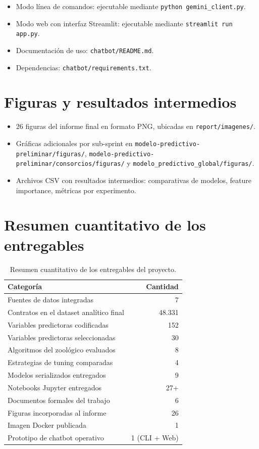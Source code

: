 \documentclass[12pt,letterpaper,oneside]{report}
\begin{document}
\begin{itemize}
    \item Modo línea de comandos: ejecutable mediante
    \texttt{python gemini\_client.py}.
    \item Modo web con interfaz Streamlit: ejecutable mediante
    \texttt{streamlit run app.py}.
    \item Documentación de uso: \texttt{chatbot/README.md}.
    \item Dependencias: \texttt{chatbot/requirements.txt}.
\end{itemize}

\section{Figuras y resultados intermedios}

\begin{itemize}
    \item 26 figuras del informe final en formato PNG, ubicadas en
    \texttt{report/imagenes/}.
    \item Gráficas adicionales por sub-sprint en
    \texttt{modelo-predictivo-preliminar/figuras/},
    \texttt{modelo-predictivo-preliminar/consorcios/figuras/} y
    \texttt{modelo\_predictivo\_global/figuras/}.
    \item Archivos CSV con resultados intermedios: comparativas de modelos,
    feature importance, métricas por experimento.
\end{itemize}

\section{Resumen cuantitativo de los entregables}

\begin{table}[H]
\centering
\caption{Resumen cuantitativo de los entregables del proyecto.}
\label{tab:resumen_entregables}
\begin{tabular}{lr}
\toprule
\textbf{Categoría} & \textbf{Cantidad} \\
\midrule
Fuentes de datos integradas & 7 \\
Contratos en el dataset analítico final & 48.331 \\
Variables predictoras codificadas & 152 \\
Variables predictoras seleccionadas & 30 \\
Algoritmos del zoológico evaluados & 8 \\
Estrategias de tuning comparadas & 4 \\
Modelos serializados entregados & 9 \\
Notebooks Jupyter entregados & 27+ \\
Documentos formales del trabajo & 6 \\
Figuras incorporadas al informe & 26 \\
Imagen Docker publicada & 1 \\
Prototipo de chatbot operativo & 1 (CLI + Web) \\
\bottomrule
\end{tabular}
\end{table}
\end{document}
